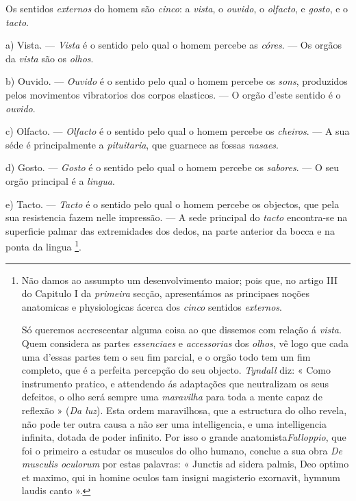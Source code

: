  
Os sentidos \emph{externos} do homem são \emph{cinco}: a \emph{vista}, o \emph{ouvido}, o \emph{olfacto}, e \emph{gosto}, e o \emph{tacto}.

a) Vista. --- \emph{Vista} é o sentido pelo qual o homem percebe as \emph{córes}. --- Os orgãos da \emph{vista} são os \emph{olhos}.

b) Ouvido. --- \emph{Ouvido} é o sentido pelo qual o homem percebe os \emph{sons}, produzidos pelos movimentos vibratorios dos corpos elasticos. --- O orgão d'este sentido é o \emph{ouvido}.

c) Olfacto. --- \emph{Olfacto} é o sentido pelo qual o homem percebe os \emph{cheiros}. --- A sua séde é principalmente a \emph{pituitaria}, que guarnece as fossas \emph{nasaes}.

d) Gosto. --- \emph{Gosto} é o sentido pelo qual o homem percebe os \emph{sabores}. --- O seu orgão principal é a \emph{lingua}.

e) Tacto. --- \emph{Tacto} é o sentido pelo qual o homem percebe os objectos, que pela sua resistencia fazem nelle impressão. --- A sede principal do \emph{tacto} encontra-se na superficie palmar das extremidades dos dedos, na parte anterior da bocca e na ponta da lingua \footnote{Não damos ao assumpto um desenvolvimento maior; pois que, no artigo III do Capitulo I da \emph{primeira} secção, apresentámos as principaes noções anatomicas e physiologicas ácerca dos \emph{cinco} sentidos \emph{externos}.\par Só queremos accrescentar alguma coisa ao que dissemos com relação á \emph{vista}. Quem considera as partes \emph{essenciaes} e \emph{accessorias} dos \emph{olhos}, vê logo que cada uma d'essas partes tem o seu fim parcial, e o orgão todo tem um fim completo, que é a perfeita percepção do seu objecto. \emph{Tyndall} diz: « Como instrumento pratico, e attendendo ás adaptações que neutralizam os seus defeitos, o olho será sempre uma \emph{maravilha} para toda a mente capaz de reflexão » (\emph{Da luz}). Esta ordem maravilhosa, que a estructura do olho revela, não pode ter outra causa a não ser uma intelligencia, e uma intelligencia infinita, dotada de poder infinito. Por isso o grande anatomista\emph{Falloppio}, que foi o primeiro a estudar os musculos do olho humano, conclue a sua obra \emph{De musculis oculorum} por estas palavras: « Junctis ad sidera palmis, Deo optimo et maximo, qui in homine oculos tam insigni magisterio exornavit, hymnum laudis canto ».}.

